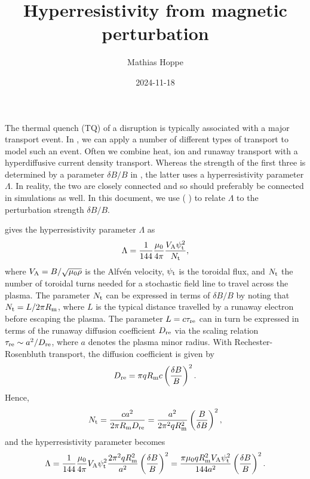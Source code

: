 \documentclass{notes}
\title{Hyperresistivity from magnetic perturbation}
\author{Mathias Hoppe}
\date{2024-11-18}
\newcommand{\citep}[1]{(\citename{#1}{author} \citefield{#1}{year})}
\begin{document}
	\maketitle

	The thermal quench (TQ) of a disruption is typically associated with a major
	transport event. In \DREAM, we can apply a number of different types of
	transport to model such an event. Often we combine heat, ion and runaway
	transport with a hyperdiffusive current density transport. Whereas the
	strength of the first three is determined by a parameter $\delta B/B$ in
	\DREAM, the latter uses a hyperresistivity parameter $\Lambda$. In reality,
	the two are closely connected and so should preferably be connected in
	simulations as well. In this document, we use \citep{Boozer2017} to
	relate $\Lambda$ to the perturbation strength $\delta B/B$.

	\cite{Boozer2017} gives the hyperresistivity parameter $\Lambda$ as
	\begin{equation}
		\Lambda =
			\frac{1}{144}
			\frac{\mu_0}{4\pi}
			\frac{V_{\rm A}\psi_{\rm t}^2}{N_{\rm t}},
	\end{equation}
	where $V_{\rm A}=B/\sqrt{\mu_0\rho}$ is the Alfvén velocity,
	$\psi_{\rm t}$ is the toroidal flux, and $N_{\rm t}$ the number of toroidal
	turns needed for a stochastic field line to travel across the plasma. The
	parameter $N_{\rm t}$ can be expressed in terms of $\delta B/B$ by noting
	that $N_{\rm t} = L/2\pi R_{\rm m}$, where $L$ is the typical distance
	travelled by a runaway electron before escaping the plasma. The parameter
	$L=c\tau_{\rm re}$ can in turn be expressed in terms of the runaway
	diffusion coefficient $D_{\rm re}$ via the scaling relation
	$\tau_{\rm re}\sim a^2/D_{\rm re}$, where $a$ denotes the plasma minor
	radius. With Rechester-Rosenbluth transport, the diffusion coefficient is
	given by
	\begin{equation}
		D_{\rm re} = \pi qR_{\rm m}c\left(\frac{\delta B}{B}\right)^2.
	\end{equation}
	Hence,
	\begin{equation}
		N_{\rm t} = \frac{c a^2}{2\pi R_{\rm m} D_{\rm re}} =
			\frac{a^2}{2\pi^2 q R_{\rm m}^2}\left(
				\frac{B}{\delta B}
			\right)^2,
	\end{equation}
	and the hyperresistivity parameter becomes
	\begin{equation}\label{eq:Lambda}
		\Lambda =
			\frac{1}{144}
			\frac{\mu_0}{4\pi}
			V_{\rm A}\psi_{\rm t}^2
			\frac{2\pi^2 qR_{\rm m}^2}{a^2}\left(
				\frac{\delta B}{B}
			\right)^2 =
			\frac{\pi \mu_0 qR_{\rm m}^2 V_{\rm A}\psi_{\rm t}^2}{144a^2}
			\left(
				\frac{\delta B}{B}
			\right)^2.
	\end{equation}
\end{document}
